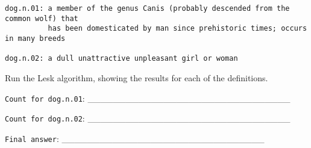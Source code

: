 \documentclass[a4paper,11pt]{scrartcl}
\begin{document}
\begin{verbatim}
dog.n.01: a member of the genus Canis (probably descended from the common wolf) that
          has been domesticated by man since prehistoric times; occurs in many breeds

dog.n.02: a dull unattractive unpleasant girl or woman
\end{verbatim}

Run the Lesk algorithm, showing the results for each of the definitions.

\verb|Count for dog.n.01|: \_\_\_\_\_\_\_\_\_\_\_\_\_\_\_\_\_\_\_\_\_\_\_\_\_\_\_\_\_\_\_\_

\verb|Count for dog.n.02|: \_\_\_\_\_\_\_\_\_\_\_\_\_\_\_\_\_\_\_\_\_\_\_\_\_\_\_\_\_\_\_\_

\verb|Final answer|: \_\_\_\_\_\_\_\_\_\_\_\_\_\_\_\_\_\_\_\_\_\_\_\_\_\_\_\_\_\_\_\_
\end{document}
